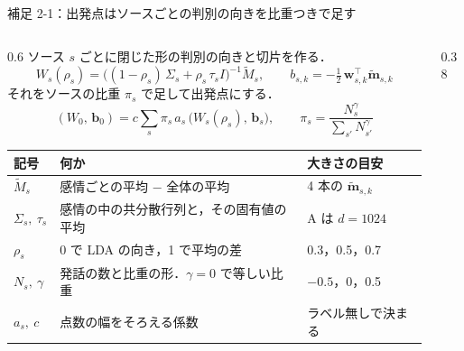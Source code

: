 \begin{frame}{補足 2-1：出発点はソースごとの判別の向きを比重つきで足す}
  \label{s:p2:start}
  \tighteq
  \begin{columns}[T,onlytextwidth]
    \begin{column}{0.6\textwidth}
      \scriptsize
      ソース $s$ ごとに閉じた形の判別の向きと切片を作る．
      \[
        W_s(\rho_s) = \bigl((1-\rho_s)\,\Sigma_s + \rho_s\,\tau_s I\bigr)^{-1}\tilde M_s,\qquad
        b_{s,k} = -\tfrac12\,\mathbf w_{s,k}^{\top}\tilde{\mathbf m}_{s,k}
      \]
      それをソースの比重 $\pi_s$ で足して出発点にする．
      \[
        (W_0,\,\mathbf b_0) = c\sum_{s} \pi_s\,a_s\,\bigl(W_s(\rho_s),\,\mathbf b_s\bigr),\qquad
        \pi_s = \frac{N_s^{\gamma}}{\sum_{s'} N_{s'}^{\gamma}}
      \]
      \setlength{\tabcolsep}{3pt}\renewcommand{\arraystretch}{1.05}
      \begin{tabular}{@{}l p{5.3cm} l@{}}
        \toprule
        記号 & 何か & 大きさの目安 \\
        \midrule
        $\tilde M_s$ & 感情ごとの平均 − 全体の平均 & 4 本の $\tilde{\mathbf m}_{s,k}$ \\
        $\Sigma_s,\ \tau_s$ & 感情の中の共分散行列と，その固有値の平均 & A は $d=1024$ \\
        $\rho_s$ & 0 で LDA の向き，1 で平均の差 & 0.3，0.5，0.7 \\
        $N_s,\ \gamma$ & 発話の数と比重の形．$\gamma=0$ で等しい比重 & $-0.5$，0，0.5 \\
        $a_s,\ c$ & 点数の幅をそろえる係数 & ラベル無しで決まる \\
        \bottomrule
      \end{tabular}\par
      \vspace{0.2em}
    \end{column}
    \begin{column}{0.38\textwidth}
      \centering
\end{column}
\end{columns}
\end{frame}
